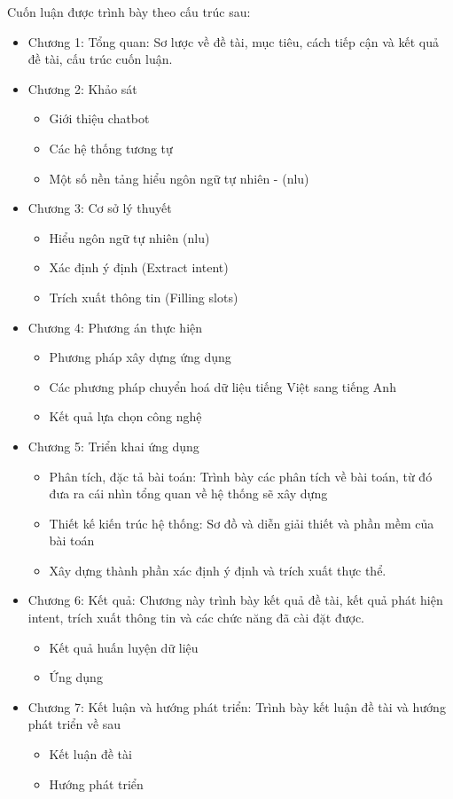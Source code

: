 Cuốn luận được trình bày theo cấu trúc sau:
\begin{itemize}
    \item Chương 1: Tổng quan: Sơ lược về đề tài, mục tiêu, cách tiếp cận và kết quả đề tài, cấu trúc cuốn luận.
    \item Chương 2: Khảo sát
          \begin{itemize}
              \item Giới thiệu chatbot
              \item Các hệ thống tương tự
              \item Một số nền tảng hiểu ngôn ngữ tự nhiên - (\ac{nlu})
          \end{itemize}
    \item Chương 3: Cơ sở lý thuyết
          \begin{itemize}
              \item Hiểu ngôn ngữ tự nhiên (\ac{nlu})
              \item Xác định ý định (Extract intent)
              \item Trích xuất thông tin (Filling slots)
          \end{itemize}
    \item Chương 4: Phương án thực hiện
    \begin{itemize}
        \item Phương pháp xây dựng ứng dụng
        \item Các phương pháp chuyển hoá dữ liệu tiếng Việt sang tiếng Anh
        \item Kết quả lựa chọn công nghệ
    \end{itemize}
    \item Chương 5: Triển khai ứng dụng
          \begin{itemize}
              \item Phân tích, đặc tả bài toán: Trình bày các phân tích về bài toán, từ đó đưa ra cái nhìn tổng quan về hệ thống sẽ xây dựng
              \item Thiết kế kiến trúc hệ thống: Sơ đồ và diễn giải thiết và phần mềm của bài toán
              \item Xây dựng thành phần xác định ý định và trích xuất thực thể.
          \end{itemize}
    \item Chương 6: Kết quả: Chương này trình bày kết quả đề tài, kết quả phát hiện intent, trích xuất thông tin và các chức năng đã cài đặt được.
          \begin{itemize}
              \item Kết quả huấn luyện dữ liệu 
              \item Ứng dụng
          \end{itemize}
    \item Chương 7: Kết luận và hướng phát triển: Trình bày kết luận đề tài và hướng phát triển về sau
          \begin{itemize}
              \item Kết luận đề tài
              \item Hướng phát triển
          \end{itemize}
\end{itemize}